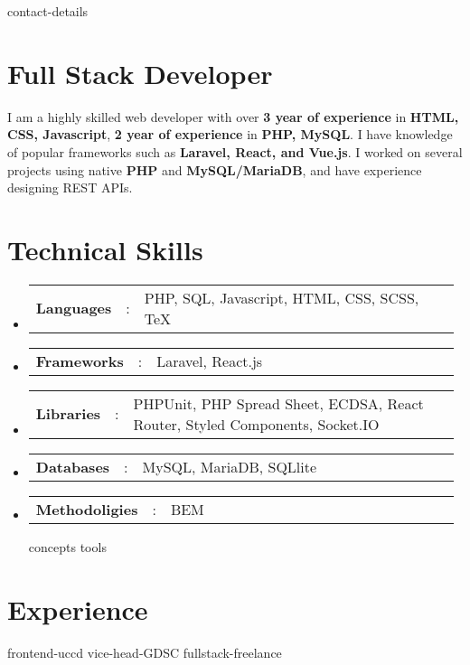 \documentclass[a4paper,11pt]{article}
\newcommand{\resumeSectionType}[3]{
  \item\begin{tabular*}{0.96\textwidth}[t]{
    p{0.15\linewidth}p{0.02\linewidth}p{0.81\linewidth}
  }
    \textbf{#1} & #2 & #3
  \end{tabular*}\vspace{-2pt}
}
\newcommand{\resumeHeadingListStart}{
  \begin{itemize}[leftmargin=0.15in, label={}]
}
\newcommand{\resumeHeadingListEnd}{\end{itemize}}
\begin{document}

{contact-details}



\section{Full Stack Developer}
\small{
  I am a highly skilled web developer with over \textbf{3 year of experience} in \textbf{HTML, CSS, Javascript}, \textbf{2 year of experience} in \textbf{PHP, MySQL}. I have knowledge of popular frameworks such as \textbf{Laravel, React, and Vue.js}. I worked on several projects using native \textbf{PHP} and \textbf{MySQL/MariaDB}, and have experience designing REST APIs.
}



\section{Technical Skills}
  \resumeHeadingListStart{}
    \resumeSectionType{Languages}{:}{PHP, SQL, Javascript, HTML, CSS, SCSS, TeX}
    \resumeSectionType{Frameworks}{:}{Laravel, React.js}
    \resumeSectionType{Libraries}{:}{PHPUnit, PHP Spread Sheet, ECDSA, React Router, Styled Components, Socket.IO}
    \resumeSectionType{Databases}{:}{MySQL, MariaDB, SQLlite}
    \resumeSectionType{Methodoligies}{:}{BEM}
    {concepts}
    {tools}
  \resumeHeadingListEnd{}



\section{Experience}
\resumeHeadingListStart{}
  {frontend-uccd}
  {vice-head-GDSC}
  {fullstack-freelance}
\resumeHeadingListEnd{}
\end{document}
